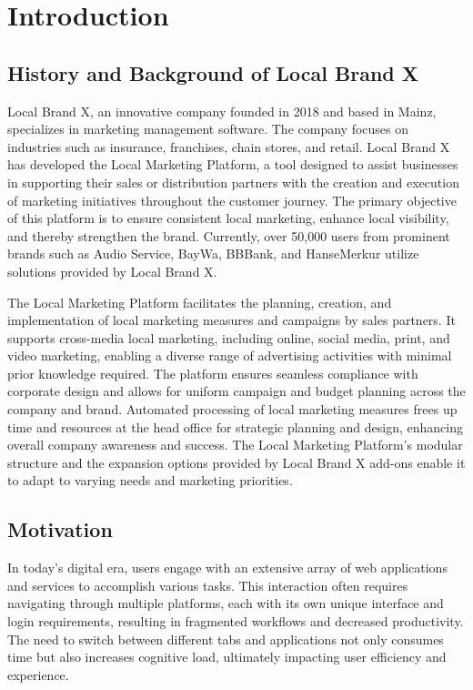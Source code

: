 \chapter{Introduction}
\label{ch:introduction}


\section{History and Background of Local Brand X}
\label{sec:intro:background}
Local Brand X, an innovative company founded in 2018 and based in Mainz, specializes in marketing management software. The company focuses on industries such as insurance, franchises, chain stores, and retail. Local Brand X has developed the Local Marketing Platform, a tool designed to assist businesses in supporting their sales or distribution partners with the creation and execution of marketing initiatives throughout the customer journey. The primary objective of this platform is to ensure consistent local marketing, enhance local visibility, and thereby strengthen the brand. Currently, over 50,000 users from prominent brands such as Audio Service, BayWa, BBBank, and HanseMerkur utilize solutions provided by Local Brand X.

The Local Marketing Platform facilitates the planning, creation, and implementation of local marketing measures and campaigns by sales partners. It supports cross-media local marketing, including online, social media, print, and video marketing, enabling a diverse range of advertising activities with minimal prior knowledge required. The platform ensures seamless compliance with corporate design and allows for uniform campaign and budget planning across the company and brand. Automated processing of local marketing measures frees up time and resources at the head office for strategic planning and design, enhancing overall company awareness and success. The Local Marketing Platform's modular structure and the expansion options provided by Local Brand X add-ons enable it to adapt to varying needs and marketing priorities.

%
%
\section{Motivation}
\label{sec:intro:motivation}
In today's digital era, users engage with an extensive array of web applications and services to accomplish various tasks. This interaction often requires navigating through multiple platforms, each with its own unique interface and login requirements, resulting in fragmented workflows and decreased productivity. The need to switch between different tabs and applications not only consumes time but also increases cognitive load, ultimately impacting user efficiency and experience.


